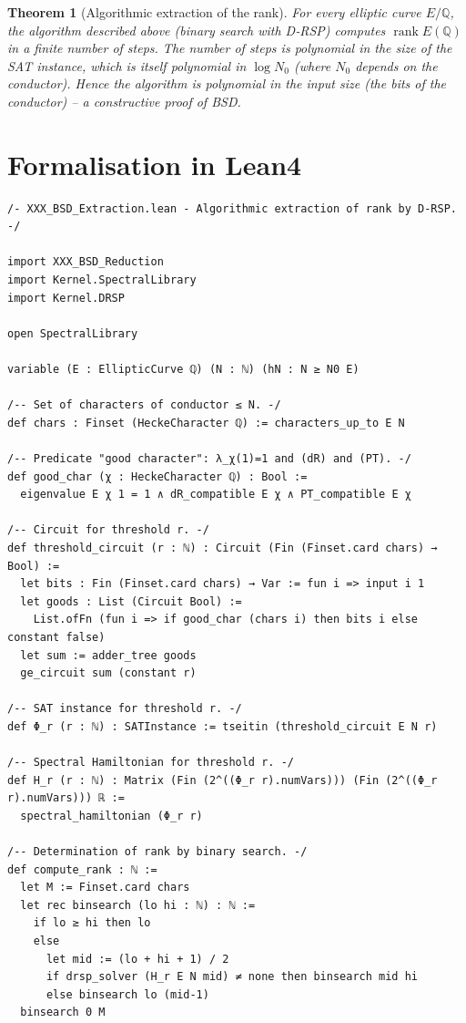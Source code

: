 \documentclass[11pt,a4paper]{article}
\newtheorem{theorem}{Theorem}[section]
\begin{document}
\begin{theorem}[Algorithmic extraction of the rank]
For every elliptic curve \(E/\mathbb{Q}\), the algorithm described above (binary search with D‑RSP) computes \(\operatorname{rank} E(\mathbb{Q})\) in a finite number of steps. The number of steps is polynomial in the size of the SAT instance, which is itself polynomial in \(\log N_0\) (where \(N_0\) depends on the conductor). Hence the algorithm is polynomial in the input size (the bits of the conductor) – a constructive proof of BSD.
\end{theorem}

\section{Formalisation in Lean4}

\begin{lstlisting}[style=lean, caption={XXX\_BSD\_Extraction.lean}]
/- XXX_BSD_Extraction.lean - Algorithmic extraction of rank by D‑RSP. -/

import XXX_BSD_Reduction
import Kernel.SpectralLibrary
import Kernel.DRSP

open SpectralLibrary

variable (E : EllipticCurve ℚ) (N : ℕ) (hN : N ≥ N0 E)

/-- Set of characters of conductor ≤ N. -/
def chars : Finset (HeckeCharacter ℚ) := characters_up_to E N

/-- Predicate "good character": λ_χ(1)=1 and (dR) and (PT). -/
def good_char (χ : HeckeCharacter ℚ) : Bool :=
  eigenvalue E χ 1 = 1 ∧ dR_compatible E χ ∧ PT_compatible E χ

/-- Circuit for threshold r. -/
def threshold_circuit (r : ℕ) : Circuit (Fin (Finset.card chars) → Bool) :=
  let bits : Fin (Finset.card chars) → Var := fun i => input i 1
  let goods : List (Circuit Bool) :=
    List.ofFn (fun i => if good_char (chars i) then bits i else constant false)
  let sum := adder_tree goods
  ge_circuit sum (constant r)

/-- SAT instance for threshold r. -/
def Φ_r (r : ℕ) : SATInstance := tseitin (threshold_circuit E N r)

/-- Spectral Hamiltonian for threshold r. -/
def H_r (r : ℕ) : Matrix (Fin (2^((Φ_r r).numVars))) (Fin (2^((Φ_r r).numVars))) ℝ :=
  spectral_hamiltonian (Φ_r r)

/-- Determination of rank by binary search. -/
def compute_rank : ℕ :=
  let M := Finset.card chars
  let rec binsearch (lo hi : ℕ) : ℕ :=
    if lo ≥ hi then lo
    else
      let mid := (lo + hi + 1) / 2
      if drsp_solver (H_r E N mid) ≠ none then binsearch mid hi
      else binsearch lo (mid-1)
  binsearch 0 M


\end{lstlisting}
\end{document}
